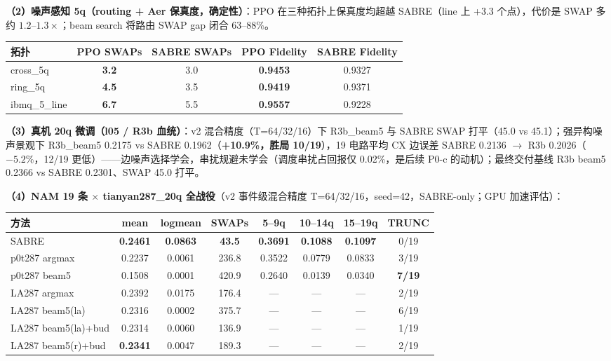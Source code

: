 \textbf{（2）噪声感知 5q（routing + Aer 保真度，确定性）}：PPO 在三种拓扑上保真度均超越 SABRE（line 上 +3.3 个点），代价是 SWAP 多约 $1.2$--$1.3\times$；beam search 将路由 SWAP gap 闭合 63--88\%。
\begin{table}[htbp]
\centering
\small
\begin{tabular}{l|cc|cc}
\hline
拓扑 & PPO SWAPs & SABRE SWAPs & PPO Fidelity & SABRE Fidelity \\
\hline
cross\_5q & \textbf{3.2} & 3.0 & \textbf{0.9453} & 0.9327 \\
ring\_5q & \textbf{4.5} & 3.5 & \textbf{0.9419} & 0.9371 \\
ibmq\_5\_line & \textbf{6.7} & 5.5 & \textbf{0.9557} & 0.9228 \\
\hline
\end{tabular}
\end{table}

\textbf{（3）真机 20q 微调（l05 / R3b 血统）}：v2 混合精度（T=64/32/16）下 R3b\_beam5 与 SABRE SWAP 打平（45.0 vs 45.1）；强异构噪声景观下 R3b\_beam5 0.2175 vs SABRE 0.1962（\textbf{+10.9\%，胜局 10/19}），19 电路平均 CX 边误差 SABRE 0.2136 $\to$ R3b 0.2026（$-5.2\%$，12/19 更低）——边噪声选择学会，串扰规避未学会（调度串扰占回报仅 0.02\%，是后续 P0-c 的动机）；最终交付基线 R3b beam5 0.2366 vs SABRE 0.2301、SWAP 45.0 打平。

\textbf{（4）NAM 19 条 $\times$ tianyan287\_20q 全战役}（v2 事件级混合精度 T=64/32/16，seed=42，SABRE-only；GPU 加速评估）：
\begin{table}[htbp]
\centering
\small
\begin{tabular}{l|ccc|ccc|c}
\hline
方法 & mean & logmean & SWAPs & 5--9q & 10--14q & 15--19q & TRUNC \\
\hline
SABRE & \textbf{0.2461} & \textbf{0.0863} & \textbf{43.5} & \textbf{0.3691} & \textbf{0.1088} & \textbf{0.1097} & 0/19 \\
p0t287 argmax & 0.2237 & 0.0061 & 236.8 & 0.3522 & 0.0779 & 0.0833 & 3/19 \\
p0t287 beam5 & 0.1508 & 0.0001 & 420.9 & 0.2640 & 0.0139 & 0.0340 & \textbf{7/19} \\
LA287 argmax & 0.2392 & 0.0175 & 176.4 & — & — & — & 2/19 \\
LA287 beam5(la) & 0.2316 & 0.0002 & 375.7 & — & — & — & 6/19 \\
LA287 beam5(la)+bud & 0.2314 & 0.0060 & 136.9 & — & — & — & 1/19 \\
LA287 beam5(r)+bud & \textbf{0.2341} & 0.0047 & 189.3 & — & — & — & 2/19 \\
\hline
\end{tabular}
\end{table}

